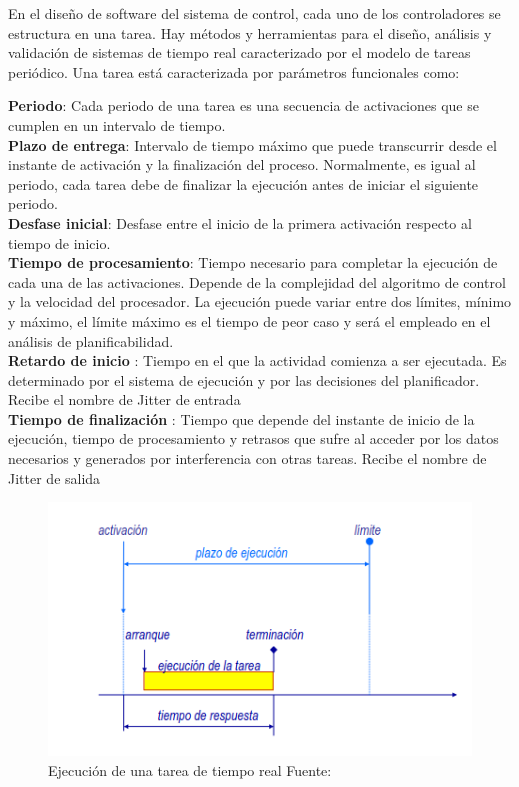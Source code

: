 \documentclass[12pt]{article}
\begin{document}

En el diseño de software del sistema de control, cada uno de los controladores se estructura en una tarea. Hay métodos y herramientas para el diseño, análisis y validación de sistemas de tiempo real caracterizado por el modelo de tareas periódico. Una tarea está caracterizada por parámetros funcionales como: 


\textbf{Periodo}: Cada periodo de una tarea es una secuencia de activaciones que se cumplen en un intervalo de tiempo.\\
\textbf{Plazo de entrega}:  Intervalo de tiempo máximo que puede transcurrir desde el instante de activación y la finalización del proceso. Normalmente, es igual al periodo, cada tarea debe de finalizar la ejecución antes de iniciar el siguiente periodo. \\
\textbf{Desfase inicial}: Desfase entre el inicio de la primera activación respecto al tiempo de inicio.\\
\textbf{Tiempo de procesamiento}: Tiempo necesario para completar la ejecución de cada una de las activaciones. Depende de la complejidad del algoritmo de control y la velocidad del procesador. La ejecución puede variar entre dos límites, mínimo y máximo, el límite máximo es el tiempo de peor caso y será el empleado en el análisis de planificabilidad.\\
\textbf{Retardo de inicio} : Tiempo en el que la actividad comienza a ser ejecutada. Es determinado por el sistema de ejecución y por las decisiones del planificador. Recibe el nombre de Jitter de entrada\\
\textbf{Tiempo de finalización} : Tiempo que depende del instante de inicio de la ejecución, tiempo de procesamiento y retrasos que sufre al acceder por los datos necesarios y generados por interferencia con otras tareas. Recibe el nombre de Jitter de salida\\


\begin{figure}[!ht]
  \centering
  \includegraphics[scale=0.5]{diagramas/tiempo_real.png}
  \caption{Ejecución de una tarea de tiempo real Fuente: \cite{de2000introduccion}}
  \label{fig:diagrama_tiempo_real}
\end{figure}
\end{document}
